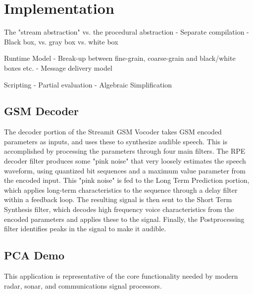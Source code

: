 \section{Implementation}

The "stream abstraction" vs. the procedural abstraction
-	Separate compilation
-	Black box, vs. gray box vs. white box

Runtime Model
-	Break-up between fine-grain, coarse-grain and black/white boxes etc.
-	Message delivery model

Scripting
-	Partial evaluation
-	Algebraic Simplification 


\subsection{GSM Decoder}

  The decoder portion of the Streamit GSM Vocoder takes GSM encoded
parameters as inputs, and uses these to synthesize audible speech.  This
is accomplished by processing the parameters through four main filters.
The RPE decoder filter produces some "pink noise" that very loosely
estimates the speech waveform, using quantized bit sequences and a
maximum value parameter from the encoded input.  This "pink noise" is
fed to the Long Term Prediction portion, which applies long-term
characteristics to the sequence through a delay filter within a feedback
loop.  The resulting signal is then sent to the Short Term Synthesis
filter, which decodes high frequency voice characteristics from the
encoded parameters and applies these to the signal.  Finally, the
Postprocessing filter identifies peaks in the signal to make it audible.

\subsection{PCA Demo}

This application is representative of the core functionality needed by
modern radar, sonar, and communications signal processors.
